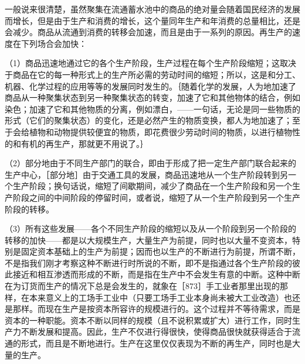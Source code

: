 一般说来很清楚，虽然聚集在流通蓄水池中的商品的绝对量会随着国民经济的发展而增长，但是由于生产和消费的增长，这个量同年生产和年消费的总量相比，还是会减少。商品从流通到消费的转移会加速，而且是由于一系列的原因。再生产的速度在下列场合会加快：

（1）商品迅速地通过它的各个生产阶段，生产过程在每个生产阶段缩短；这取决于商品在它的每一种形式上的生产所必需的劳动时间的缩短；所以，这是和分工、机器、化学过程的应用等等的发展同时发生的。｛随着化学的发展，人为地加速了商品从一种聚集状态到另一种聚集状态的转变，加速了它和其他物体的结合，例如染色；加速了它和其他物质的分离，例如漂白，——一句话，无论是同一些物质的形式（它们的聚集状态）的变化，还是必然产生的物质变换，都人为地加速了；至于会给植物和动物提供较便宜的物质，即花费很少劳动时间的物质，以进行植物性的和有机的再生产，那就更不用说了。｝

（2）部分地由于不同生产部门的联合，即由于形成了把一定生产部门联合起来的生产中心，［部分地］由于交通工具的发展，商品迅速地从一个生产阶段转到另一个生产阶段；换句话说，缩短了间歇期间，减少了商品在一个生产阶段和另一个生产阶段之间的中间阶段的停留时间，或者说，缩短了从一个生产阶段到另一个生产阶段的转移。

（3）所有这些发展——各个不同生产阶段的缩短以及从一个阶段到另一个阶段的转移的加快——都是以大规模生产，大量生产为前提，同时也以大量不变资本，特别是固定资本基础上的生产为前提；因而也以生产的不断进行为前提，所谓不断，不是指我们刚才考察这种不断进行时所说的不断，即不是指通过各个生产阶段的彼此接近和相互渗透而形成的不断，而是指在生产中不会发生有意的中断。这种中断在为订货而生产的情况下总是会发生的，就象在［873］手工业者那里出现的那样，在本来意义上的工场手工业中（只要工场手工业本身尚未被大工业改造）也还是那样。而现在生产是按资本所容许的规模进行的。这个过程并不等待需求，而是资本的一种职能。资本不断以同样的规模（且不说积累或扩大）进行工作，同时生产力不断发展和提高。因此，生产不仅进行得很快，使得商品很快就获得适合于流通的形式，而且是不断地进行。生产在这里仅仅表现为不断的再生产，同时也是大量的生产。


